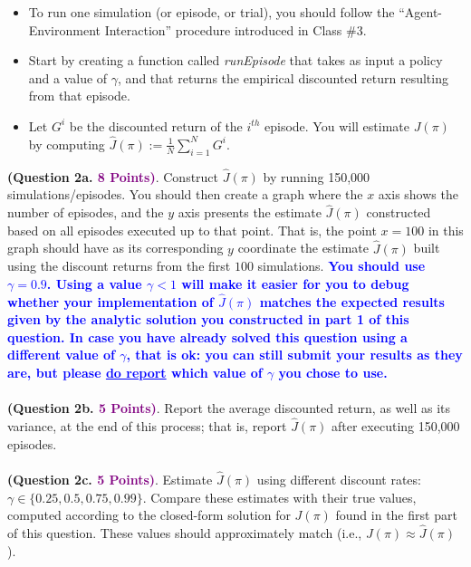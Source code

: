\documentclass{article}
\newcommand{\POINTS}[1]{\textcolor{purple}{\textbf{{#1}}}}
\begin{document}
\begin{itemize}
    \item To run one simulation (or episode, or trial), you should follow the ``Agent-Environment Interaction'' procedure introduced in Class \#3. 
    \item Start by creating a function called \textit{runEpisode} that takes as input a policy and a value of $\gamma$, and that returns the empirical discounted return resulting from that episode.
    \item Let $G^i$ be the discounted return of the $i^{th}$ episode. You will estimate $J(\pi)$ by computing $\hat{J}(\pi) := \frac{1}{N} \sum_{i=1}^N G^i$.
\end{itemize}
\textbf{(Question 2a. \POINTS{8 Points)}}. Construct $\hat{J}(\pi)$ by running 150,000 simulations/episodes. You should then create a graph where the $x$ axis shows the number of episodes, and the $y$ axis presents the estimate $\hat{J}(\pi)$ constructed based on all episodes executed up to that point. That is, the point $x=100$ in this graph should have as its corresponding $y$ coordinate the estimate $\hat{J}(\pi)$ built using the discount returns from the first $100$ simulations. \textcolor{blue}{\textbf{You should use $\gamma=0.9$. Using a value $\gamma < 1$ will make it easier for you to debug whether your implementation of $\hat{J}(\pi)$ matches the expected results given by the analytic solution you constructed in part 1 of this question. In case you have already solved this question using a different value of $\gamma$, that is ok: you can still submit your results as they are, but please \underline{\textbf{do report}} which value of $\gamma$ you chose to use.}}
\\ \\
\textbf{(Question 2b. \POINTS{5 Points)}}. Report the average discounted return, as well as its variance, at the end of this process; that is, report  $\hat{J}(\pi)$ after executing 150,000 episodes.
\\ \\
\textbf{(Question 2c. \POINTS{5 Points)}}. Estimate $\hat{J}(\pi)$ using different discount rates: $\gamma \in \{0.25, 0.5, 0.75, 0.99\}$. Compare these estimates with their true values, computed according to the closed-form solution for $J(\pi)$ found in the first part of this question. These values should approximately match (i.e., $J(\pi) \approx \hat{J}(\pi)$).
\\ \\
\end{document}
